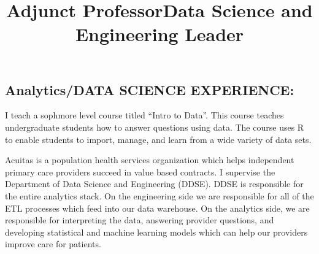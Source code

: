 \documentclass[line, mm, 10pt]{res}
\begin{document}
\address{\href{mailto:andy.choens@gmail.com}{andy.choens@gmail.com}}
\address{\href{tel:(518) 275-5984}{(518) 275-5984}}

\begin{resume}


  \section{Analytics/DATA SCIENCE EXPERIENCE:}


  \title{Adjunct Professor}
  \begin{position}
    I teach a sophmore level course titled ``Intro to Data''. This
    course teaches undergraduate students how to answer questions
    using data. The course uses R to enable students to import,
    manage, and learn from a wide variety of data sets.
  \end{position}

  \title{Data Science and Engineering Leader}
  \begin{position}
    Acuitas is a population health services organization which helps
    independent primary care providers succeed in value based
    contracts. I supervise the Department of Data Science and
    Engineering (DDSE). DDSE is responsible for the entire analytics
    stack. On the engineering side we are responsible for all of the
    ETL processes which feed into our data warehouse. On the analytics
    side, we are responsible for interpreting the data, answering
    provider questions, and developing statistical and machine
    learning models which can help our providers improve care for
    patients.
  \end{position}
    


\end{resume}
\end{document}
